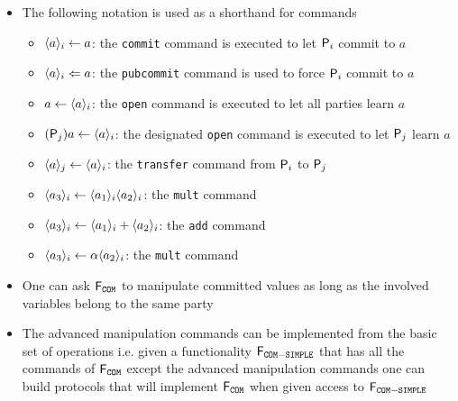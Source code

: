 \begin{itemize}
	\item The following notation is used as a shorthand for commands
  \begin{itemize}
		\item $\commit{a}{i} \leftarrow a$: the \texttt{commit} command is executed to let $\P_i$ commit to $a$
		\item $\commit{a}{i} \Leftarrow a$: the \texttt{pubcommit} command is used to force $\P_i$ commit to $a$
		\item $a \leftarrow \commit{a}{i}$: the \texttt{open} command is executed to let all parties learn $a$
		\item $(\P_j)a \leftarrow \commit{a}{i}$: the designated \texttt{open} command is executed to let $\P_j$ learn $a$
		\item $\commit{a}{j} \leftarrow \commit{a}{i}$: the \texttt{transfer} command from $\P_i$ to $\P_j$
		\item $\commit{a_3}{i} \leftarrow \commit{a_1}{i}\commit{a_2}{i}$: the \texttt{mult} command
		\item $\commit{a_3}{i} \leftarrow \commit{a_1}{i} + \commit{a_2}{i}$: the \texttt{add} command
		\item $\commit{a_3}{i} \leftarrow \alpha\commit{a_2}{i}$: the \texttt{mult} command
  \end{itemize}

	\item One can ask $\FCOM$ to manipulate committed values as long as the involved variables belong to the same party

  \item The advanced manipulation commands can be implemented from the basic set of operations i.e. given a functionality $\F_{\COM-\mathtt{SIMPLE}}$ that has all the commands of $\FCOM$ except the advanced manipulation commands one can build protocols that will implement $\FCOM$ when given access to $\F_{\COM-\mathtt{SIMPLE}}$
\end{itemize}

